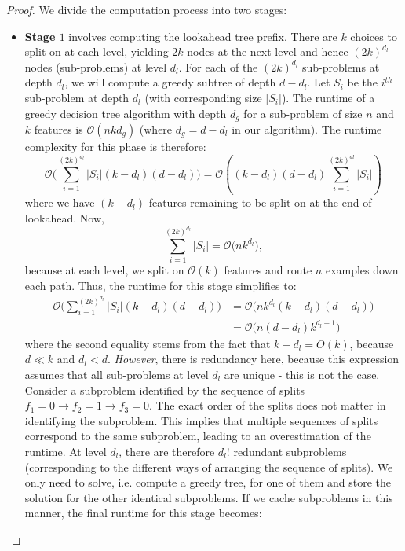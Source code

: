 \runtimelookahead*
\begin{proof}

We divide the computation process into two stages:
\begin{itemize}
    \item \textbf{Stage $1$} involves computing the lookahead tree prefix. There are $k$ choices to split on at each level, yielding $2k$ nodes at the next level and hence $(2k)^{d_l}$ nodes (sub-problems) at level $d_l$. For each of the $(2k)^{d_l}$ sub-problems at depth $d_l$, we will compute a greedy subtree of depth $d-d_l$.  
    Let $S_i$ be the $i^{th}$ sub-problem at depth $d_l$ (with corresponding size $|S_i|$). 
    The runtime of a greedy decision tree algorithm with depth $d_g$ for a sub-problem of size $n$ and $k$ features is $\mathcal{O}(nkd_g)$ (where $d_g = d - d_l$ in our algorithm). The runtime complexity for this phase is therefore: 
    \begin{equation}
        \mathcal{O}\Big(\sum_{i=1}^{(2k)^{d_l}} |S_i|(k-d_l)(d-d_l)\Big) = \mathcal{O} \left((k-d_l)(d-d_l) \sum_{i=1}^{(2k)^{dl}} |S_i|\right)
    \end{equation}
    where we have $(k-d_l)$ features remaining to be split on at the end of lookahead. Now,
    \begin{equation}
        \sum_{i=1}^{(2k)^{d_l}} |S_i| = \mathcal{O}\Big(nk^{d_l}\Big),
    \end{equation}
   because at each level, we split on $\mathcal{O}(k)$ features and route $n$ examples down each path. Thus, the runtime for this stage simplifies to:
   \begin{align}
       \mathcal{O}\Big(\sum_{i=1}^{(2k)^{d_l}} |S_i|(k-d_l)(d-d_l)\Big) &= \mathcal{O}\big(nk^{d_l}(k-d_l)(d-d_l)\big) \\
       &= \mathcal{O}\big(n(d-d_l)k^{d_l+1}\big)
   \end{align}
    where the second equality stems from the fact that $k-d_l = O(k)$, because $d \ll k$ and $d_l < d$. \textit{However}, there is redundancy here, because this expression assumes that all sub-problems at level $d_l$ are unique - this is not the case. Consider a subproblem identified by the sequence of splits $f_1 = 0 \rightarrow f_2 = 1 \rightarrow  f_3 = 0$. The exact order of the splits does not matter in identifying the subproblem. This implies that multiple sequences of splits correspond to the same subproblem, leading to an overestimation of the runtime. At level $d_l$, there are therefore $d_l!$ redundant subproblems (corresponding to the different ways of arranging the sequence of splits). We only need to solve, i.e. compute a greedy tree, for one of them and store the solution for the other identical subproblems. If we cache subproblems in this manner, the final runtime for this stage becomes:

\end{itemize}
\end{proof}
